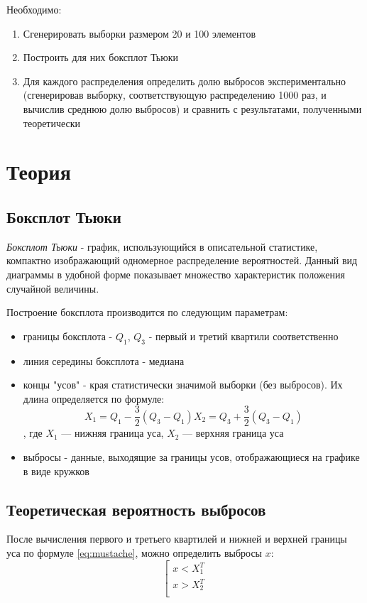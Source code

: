 \documentclass[12pt,a4paper]{article}
\begin{document}
Необходимо:
\begin{enumerate}
    \item Сгенерировать выборки размером 20 и 100 элементов
    \item Построить для них боксплот Тьюки
    \item Для каждого распределения определить долю выбросов экспериментально (сгенерировав выборку, соответствующую распределению 1000 раз, и вычислив среднюю долю выбросов) и сравнить с результатами, полученными теоретически
\end{enumerate}

\section{Теория}
\subsection{Боксплот Тьюки}
\textit{Боксплот Тьюки} - график, использующийся в описательной статистике, компактно изображающий одномерное распределение вероятностей. Данный вид диаграммы в удобной форме показывает множество характеристик положения случайной величины.

Построение боксплота производится по следующим параметрам:
\begin{itemize}
    \item границы боксплота - $Q_1$, $Q_3$ - первый и третий квартили соответственно
    \item линия середины боксплота - медиана
    \item концы "усов" - края статистически значимой выборки (без выбросов). Их длина определяется по формуле:
        \begin{equation}
            X_1=Q_1-\frac{3}{2}(Q_3-Q_1)
            X_2=Q_3+\frac{3}{2}(Q_3-Q_1)
        \label{eq:mustache}
        \end{equation}
        , где $X_1$ — нижняя граница уса, $X_2$ — верхняя граница уса
    \item выбросы - данные, выходящие за границы усов, отображающиеся на графике в виде кружков
\end{itemize}

\subsection{Теоретическая вероятность выбросов}
После вычисления первого и третьего квартилей и нижней и верхней границы уса по формуле \eqref{eq:mustache}, можно определить выбросы $x:$
\begin{equation}
	\left[
	\begin{array}{ll}
        x<X_1^T\\
		x>X_2^T\\
	\end{array}
    \right.
\end{equation}
\end{document}
